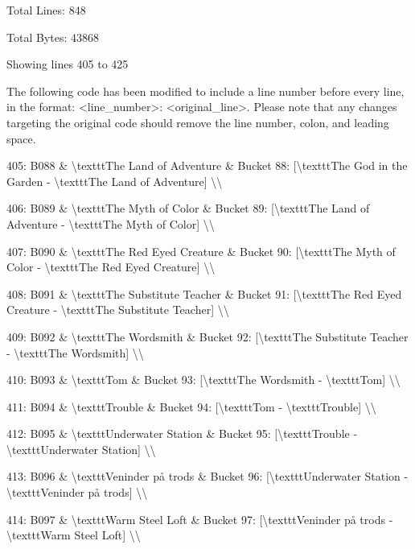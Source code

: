 \documentclass[11pt,a4paper]{article}
\begin{document}
Total Lines: 848

Total Bytes: 43868

Showing lines 405 to 425

The following code has been modified to include a line number before every line, in the format: <line\_number>: <original\_line>. Please note that any changes targeting the original code should remove the line number, colon, and leading space.

405: B088 \& \textbackslash{}texttt{The Land of Adventure} \& Bucket 88: [\textbackslash{}texttt{The God in the Garden} - \textbackslash{}texttt{The Land of Adventure}] \textbackslash{}\textbackslash{}

406: B089 \& \textbackslash{}texttt{The Myth of Color} \& Bucket 89: [\textbackslash{}texttt{The Land of Adventure} - \textbackslash{}texttt{The Myth of Color}] \textbackslash{}\textbackslash{}

407: B090 \& \textbackslash{}texttt{The Red Eyed Creature} \& Bucket 90: [\textbackslash{}texttt{The Myth of Color} - \textbackslash{}texttt{The Red Eyed Creature}] \textbackslash{}\textbackslash{}

408: B091 \& \textbackslash{}texttt{The Substitute Teacher} \& Bucket 91: [\textbackslash{}texttt{The Red Eyed Creature} - \textbackslash{}texttt{The Substitute Teacher}] \textbackslash{}\textbackslash{}

409: B092 \& \textbackslash{}texttt{The Wordsmith} \& Bucket 92: [\textbackslash{}texttt{The Substitute Teacher} - \textbackslash{}texttt{The Wordsmith}] \textbackslash{}\textbackslash{}

410: B093 \& \textbackslash{}texttt{Tom} \& Bucket 93: [\textbackslash{}texttt{The Wordsmith} - \textbackslash{}texttt{Tom}] \textbackslash{}\textbackslash{}

411: B094 \& \textbackslash{}texttt{Trouble} \& Bucket 94: [\textbackslash{}texttt{Tom} - \textbackslash{}texttt{Trouble}] \textbackslash{}\textbackslash{}

412: B095 \& \textbackslash{}texttt{Underwater Station} \& Bucket 95: [\textbackslash{}texttt{Trouble} - \textbackslash{}texttt{Underwater Station}] \textbackslash{}\textbackslash{}

413: B096 \& \textbackslash{}texttt{Veninder på trods} \& Bucket 96: [\textbackslash{}texttt{Underwater Station} - \textbackslash{}texttt{Veninder på trods}] \textbackslash{}\textbackslash{}

414: B097 \& \textbackslash{}texttt{Warm Steel Loft} \& Bucket 97: [\textbackslash{}texttt{Veninder på trods} - \textbackslash{}texttt{Warm Steel Loft}] \textbackslash{}\textbackslash{}
\end{document}
